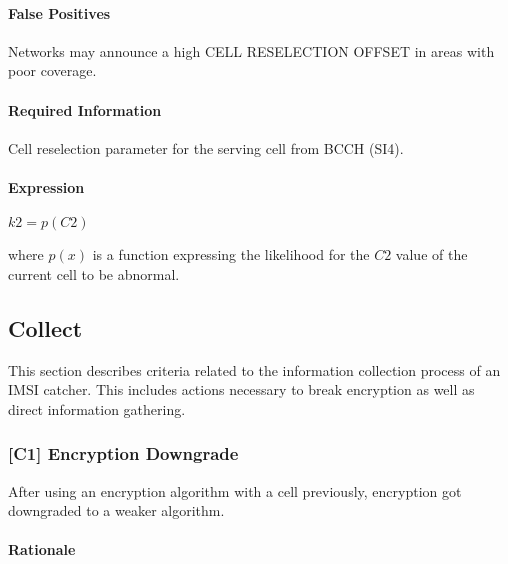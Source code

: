 \documentclass[a4paper,11pt,notitlepage,bigheadings,oneside]{scrartcl}
\begin{document}
\paragraph{False Positives}

Networks may announce a high CELL RESELECTION OFFSET in areas with poor
coverage.


\paragraph{Required Information}

Cell reselection parameter for the serving cell from BCCH (SI4).

\paragraph{Expression}

$k2 = p(C2)$

where $p(x)$ is a function expressing the likelihood for the $C2$ value of the
current cell to be abnormal.


\subsection{Collect}

This section describes criteria related to the information collection process
of an IMSI catcher. This includes actions necessary to break encryption as well
as direct information gathering.

\subsubsection{[C1] Encryption Downgrade}

After using an encryption algorithm with a cell previously, encryption got
downgraded to a weaker algorithm.

\paragraph{Rationale}
\end{document}
